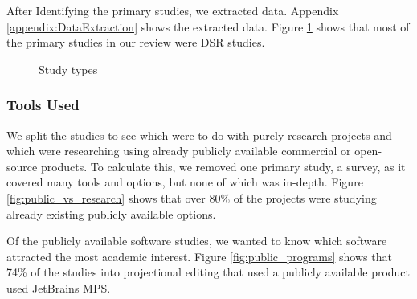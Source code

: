 After Identifying the primary studies, we extracted data.
Appendix \ref{appendix:DataExtraction} shows the extracted data.
Figure \ref{fig:study_types} shows that most of the primary studies in our review were DSR studies.

\begin{figure}[h]
    \centering
    \caption{Study types}
    \label{fig:study_types}
\end{figure}

\subsubsection{Tools Used}

We split the studies to see which were to do with purely research projects and which were researching using already publicly available commercial or open-source products.
To calculate this, we removed one primary study, a survey, as it covered many tools and options, but none of which was in-depth.
Figure \ref{fig:public_vs_research} shows that over 80\% of the projects were studying already existing publicly available options.

Of the publicly available software studies, we wanted to know which software attracted the most academic interest.
Figure \ref{fig:public_programs} shows that 74\% of the studies into projectional editing that used a publicly available product used JetBrains MPS.

